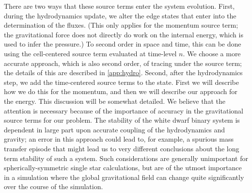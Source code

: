 \documentclass[iop]{../emulateapj}
\begin{document}
There are two ways that these source terms enter the system evolution. 
First, during the hydrodynamics update, we alter the edge states that enter
into the determination of the fluxes. (This only applies for the momentum source term;
the gravitational force does not directly do work on the internal energy, which is used 
to infer the pressure.) To second order in space and time, 
this can be done using the cell-centered
source term evaluated at time-level $n$. We choose a more accurate approach, 
which is also second order, of tracing
under the source term; the details of this are described in 
\autoref{app:hydro}. Second, after the hydrodynamics step, we add the time-centered source terms
to the state. First we will describe how we do this for the momentum,
and then we will describe our approach for the energy. This discussion will be somewhat detailed.
We believe that the attention is necessary because of the importance of accuracy
in the gravitational source terms for our problem. The stability of the white dwarf binary
system is dependent in large part upon accurate coupling of the hydrodynamics and gravity;
an error in this approach could lead to, for example, a spurious mass transfer episode
that might lead us to very different conclusions about the long term stability of such a system.
Such considerations are generally unimportant for spherically-symmetric single star calculations,
but are of the utmost importance in a simulation where the global gravitational field can change 
quite significantly over the course of the simulation.
\end{document}
